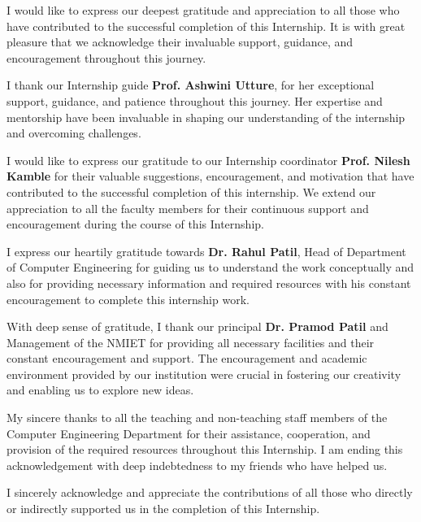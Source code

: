 \documentclass[12pt, a4paper, oneside]{report}
\begin{document}
I would like to express our deepest gratitude and appreciation to all those who have 
contributed to the successful completion of this Internship. It is with great pleasure that we 
acknowledge their invaluable support, guidance, and encouragement throughout this journey.

I thank our Internship guide \textbf{Prof. Ashwini Utture}, for her exceptional support, 
guidance, and patience throughout this journey. Her expertise and mentorship have been 
invaluable in shaping our understanding of the internship and overcoming challenges.

I would like to express our gratitude to our Internship coordinator \textbf{Prof. Nilesh Kamble} 
for their valuable suggestions, encouragement, and motivation that have contributed to the 
successful completion of this internship. We extend our appreciation to all the faculty members 
for their continuous support and encouragement during the course of this Internship.

I express our heartily gratitude towards \textbf{Dr. Rahul Patil}, Head of Department of 
Computer Engineering for guiding us to understand the work conceptually and also for 
providing necessary information and required resources with his constant encouragement to 
complete this internship work.

With deep sense of gratitude, I thank our principal \textbf{Dr. Pramod Patil} and Management 
of the NMIET for providing all necessary facilities and their constant encouragement and 
support. The encouragement and academic environment provided by our institution were 
crucial in fostering our creativity and enabling us to explore new ideas.

My sincere thanks to all the teaching and non-teaching staff members of the Computer 
Engineering Department for their assistance, cooperation, and provision of the required 
resources throughout this Internship. I am ending this acknowledgement with deep 
indebtedness to my friends who have helped us.

I sincerely acknowledge and appreciate the contributions of all those who directly or 
indirectly supported us in the completion of this Internship.


\tableofcontents
\vspace*{-2cm}
\thispagestyle{fancy}


\clearpage
{}
\setcounter{page}{1}
\end{document}

